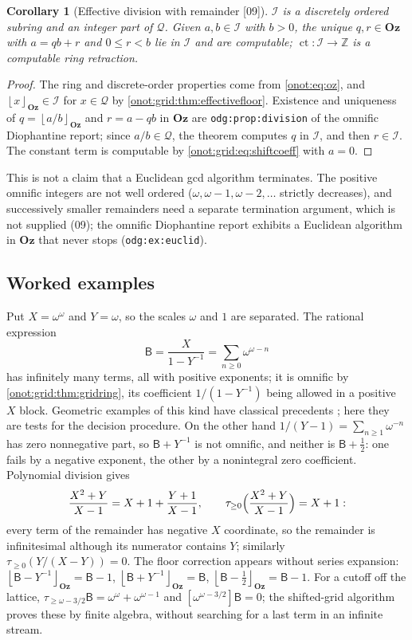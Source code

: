 \documentclass[11pt,oneside]{article}
\numberwithin{equation}{section}
\newtheorem{corollary}[corollary]{Corollary}
\theoremstyle{definition}
\theoremstyle{remark}
\newcommand{\Oz}{\mathbf{Oz}}
\newcommand{\Z}{\mathbb Z}
\newcommand{\QO}{\mathcal Q}
\newcommand{\IO}{\mathcal I}
\newcommand{\sB}{\mathsf B}
\newcommand{\ct}{\operatorname{ct}}
\newcommand{\tr}[1]{\tau_{\ge #1}}
\newcommand{\fl}[1]{\left\lfloor #1\right\rfloor_{\Oz}}
\newcommand{\src}[1]{\textup{\textsf{\small[#1]}}}
\newcommand{\replabel}[1]{\nolinkurl{#1}}
\begin{document}
\begin{corollary}[Effective division with remainder \src{09}]\label{onot:grid:cor:division}
$\IO$ is a discretely ordered subring and an integer part of $\QO$. Given
$a,b\in\IO$ with $b>0$, the unique $q,r\in\Oz$ with $a=qb+r$ and $0\le r<b$ lie in
$\IO$ and are computable; $\ct:\IO\to\Z$ is a computable ring retraction.
\end{corollary}
\begin{proof}
The ring and discrete-order properties come from \eqref{onot:eq:oz}, and
$\fl x\in\IO$ for $x\in\QO$ by \cref{onot:grid:thm:effectivefloor}. Existence and
uniqueness of $q=\fl{a/b}$ and $r=a-qb$ in $\Oz$ are \replabel{odg:prop:division}
of the omnific Diophantine report; since $a/b\in\QO$, the theorem computes $q$ in
$\IO$, and then $r\in\IO$. The constant term is computable by
\eqref{onot:grid:eq:shiftcoeff} with $a=0$.
\end{proof}

This is not a claim that a Euclidean gcd algorithm terminates. The positive
omnific integers are not well ordered ($\omega,\omega-1,\omega-2,\ldots$ strictly
decreases), and successively smaller remainders need a separate termination
argument, which is not supplied (09); the omnific Diophantine report exhibits a
Euclidean algorithm in $\Oz$ that never stops (\replabel{odg:ex:euclid}).

\subsection{Worked examples}\label{onot:grid:sub:examples}

Put $X=\omega^\omega$ and $Y=\omega$, so the scales $\omega$ and $1$ are
separated. The rational expression
\begin{equation}\label{onot:grid:eq:Bexample}
 \sB=\frac X{1-Y^{-1}}=\sum_{n\ge0}\omega^{\omega-n}
\end{equation}
has infinitely many terms, all with positive exponents; it is omnific by
\cref{onot:grid:thm:gridring}, its coefficient $1/(1-Y^{-1})$ being allowed in a
positive $X$ block. Geometric examples of this kind have classical precedents
\cite{LM}; here they are tests for the decision procedure. On the other hand
$1/(Y-1)=\sum_{n\ge1}\omega^{-n}$ has zero nonnegative part, so $\sB+Y^{-1}$ is
not omnific, and neither is $\sB+\tfrac12$: one fails by a negative exponent, the
other by a nonintegral zero coefficient. Polynomial division gives
\begin{equation}\label{onot:grid:eq:divisionexample}
 \frac{X^2+Y}{X-1}=X+1+\frac{Y+1}{X-1},\qquad \tr0\Bigl(\frac{X^2+Y}{X-1}\Bigr)=X+1:
\end{equation}
every term of the remainder has negative $X$ coordinate, so the remainder is
infinitesimal although its numerator contains $Y$; similarly $\tr0(Y/(X-Y))=0$.
The floor correction appears without series expansion:
$\fl{\sB-Y^{-1}}=\sB-1$, $\fl{\sB+Y^{-1}}=\sB$, $\fl{\sB-\tfrac12}=\sB-1$. For a
cutoff off the lattice, $\tau_{\ge\omega-3/2}\sB=\omega^\omega+\omega^{\omega-1}$
and $[\omega^{\omega-3/2}]\sB=0$; the shifted-grid algorithm proves these by
finite algebra, without searching for a last term in an infinite stream.
\end{document}
